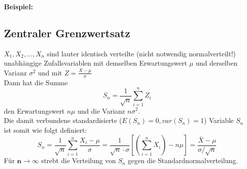 		\textbf{Beispiel:}\\
		
	\subsection{Zentraler Grenzwertsatz}
		$X_1, X_2, \ldots , X_n$ sind lauter identisch verteilte (nicht notwendig normalverteilt!)
		unabhängige Zufallsvariablen mit demselben Erwartungswert $\mu$ und derselben Varianz $\sigma^2$
		und mit $Z = \frac{X-\mu}{\sigma}$\\
	  	Dann hat die Summe
		\begin{equation}
			S_n = \frac{1}{\sqrt{n}}\sum_{i=1}^n Z_i \nonumber
		\end{equation}
		den Erwartungswert $n \mu$ und die Varianz $n \sigma^2$. \\
	  	Die damit verbundene standardisierte ($E(S_n) = 0, var(S_n) = 1$) Variable $S_n$ ist somit wie
	  	folgt definiert: \\ 
		\begin{equation}
			S_n = \frac{1}{\sqrt{n}}\sum_{i=1}^n \frac{X_i - \mu}{\sigma}
			= \frac{1}{\sqrt{n}\cdot \sigma}\left[\left(\sum\limits_{i=1}^n X_i\right) -n \mu\right]
			=\dfrac{\bar{X} - \mu}{\sigma / \sqrt{n}} \nonumber
		\end{equation}
	  	Für $\boldsymbol{n \to \infty}$ strebt die Verteilung von $S_n$ gegen die Standardnormalverteilung.
	

